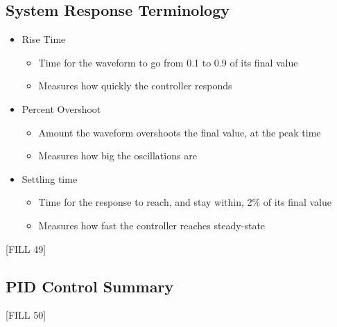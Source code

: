 \documentclass[10pt]{article}
\begin{document}
\subsection*{System Response Terminology}
\begin{itemize}
	\item Rise Time
	\begin{itemize}
        \item Time for the waveform to go from 0.1 to 0.9 of its final value
        \item Measures how quickly the controller responds
    \end{itemize}
	\item Percent Overshoot
	\begin{itemize}
        \item Amount the waveform overshoots the final value, at the peak time
        \item Measures how big the oscillations are
    \end{itemize}
	\item Settling time
	\begin{itemize}
        \item Time for the response to reach, and stay within, 2\% of its final value
        \item Measures how fast the controller reaches steady-state
    \end{itemize}
\end{itemize}
\begin{center} 
	[FILL 49]
\end{center}

\subsection*{PID Control Summary}
[FILL 50]

\subsection*{}
\end{document}
